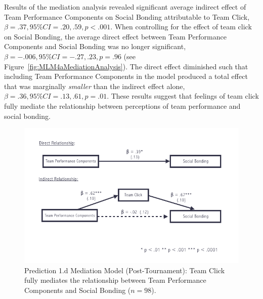 \begin{CJK}{UTF8}{gbsn}
  Results of the mediation analysis revealed significant average indirect effect of Team Performance Components on Social Bonding attributable to Team Click, $\beta = .37, 95\% CI = .20 , .59, p < .001$.  When controlling for the effect of team click on Social Bonding, the average direct effect between Team Performance Components and Social Bonding was no longer significant, $\beta = -.006, 95\% CI = -.27 , .23, p = .96 $ (see Figure~\ref{fig:MLM4aMediationAnalysis}). The direct effect diminished such that including Team Performance Components in the model produced a total effect that was marginally \textit{smaller} than the indirect effect alone, $\beta = .36, 95\% CI = .13 , .61, p = .01$. These results suggest that feelings of team click fully mediate the relationship between perceptions of team performance and social bonding.



  \begin{figure}
    \centering
    \includegraphics[width=0.9\linewidth,keepaspectratio] {images/tournamentSurveyMediationFigure}
    \caption{Prediction 1.d Mediation Model (Post-Tournament): Team Click fully mediates the relationship between Team Performance Components and Social Bonding ($n = 98$).}
    \label{fig:tournamentSurveyMediationFigure}
  \end{figure}



\end{CJK}
